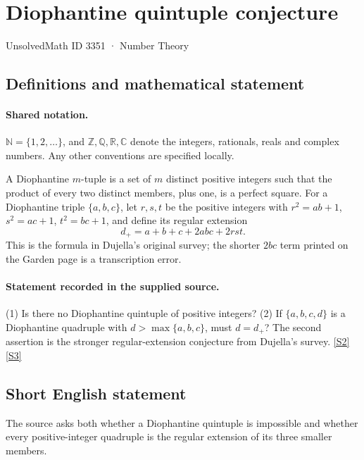 \documentclass[11pt]{article}
\newcommand{\sref}[2]{\hyperlink{source:#1:#2}{[S#2]}}
\begin{document}
\setcounter{section}{3350}
\section{Diophantine quintuple conjecture}\label{3351}
{\small\sffamily UnsolvedMath ID 3351 · Number Theory}
\subsection{Definitions and mathematical statement}

\paragraph{Shared notation.}$\mathbb N=\{1,2,\ldots\}$, and $\mathbb Z,\mathbb Q,\mathbb R,\mathbb C$ denote the integers, rationals, reals and complex numbers. Any other conventions are specified locally.


A Diophantine $m$-tuple is a set of $m$ distinct positive integers such that the product of every two distinct members, plus one, is a perfect square. For a Diophantine triple $\{a,b,c\}$, let $r,s,t$ be the positive integers with $r^2=ab+1$, $s^2=ac+1$, $t^2=bc+1$, and define its regular extension\[ d_+=a+b+c+2abc+2rst. \] This is the formula in Dujella's original survey; the shorter $2bc$ term printed on the Garden page is a transcription error.
\paragraph{Statement recorded in the supplied source.}
(1) Is there no Diophantine quintuple of positive integers? (2) If $\{a,b,c,d\}$ is a Diophantine quadruple with $d>\max\{a,b,c\}$, must $d=d_+$? The second assertion is the stronger regular-extension conjecture from Dujella's survey. \sref{3351}{2} \sref{3351}{3}
\subsection{Short English statement}
The source asks both whether a Diophantine quintuple is impossible and whether every positive-integer quadruple is the regular extension of its three smaller members.
\end{document}
